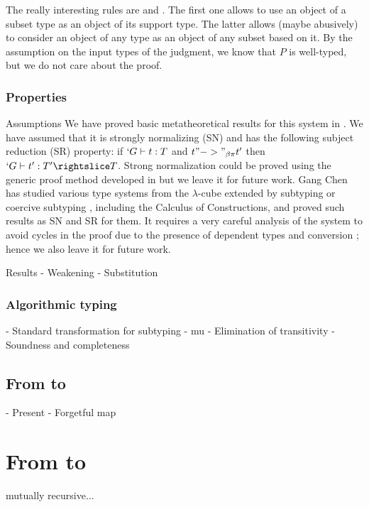 \documentclass[twocolumn]{article}
\begin{document}
The really interesting rules are  and
. The first one allows to use an object of a subset type
as an object of its support type. The latter allows (maybe abusively) to
consider an object of any type as an object of any subset based on
it. By the assumption on the input types of the judgment, we know that $P$
is well-typed, but we do not care about the proof.

\subsubsection{Properties}
\begin{paragraph}{Assumptions}
  We have proved basic metatheoretical results for this system in \Coq{}
  \cite{CCP}. We have assumed that it is strongly normalizing (SN) and has the
  following subject reduction (SR) property: if $`G \vdash t : T$ and $t
  "->"_{\beta\pi} t'$ then $`G \typed t' : T' \subd T$. Strong normalization
  could be proved using the generic proof method developed in
  \cite{Geuvers} but we leave it for future work. Gang Chen
  \cite{GangChen} has studied various type systems from the
  $\lambda$-cube extended by subtyping or coercive subtyping \cite{Luo},
  including the Calculus of Constructions, and proved such results as
  SN and SR for them. It requires a very careful analysis of the system 
  to avoid cycles in the proof due to the presence of dependent types and
  conversion ; hence we also leave it for future work.
\end{paragraph}

\begin{paragraph}{Results}
  - Weakening
  - Substitution
\end{paragraph}

\subsubsection{Algorithmic typing}
  - Standard transformation for subtyping
  - mu
  - Elimination of transitivity
  - Soundness and completeness

\subsection{From \CCq to \lng{}}
- Present \CCq
- Forgetful map

\section{From \lng{} to \CCq{}}
mutually recursive...
\end{document}
